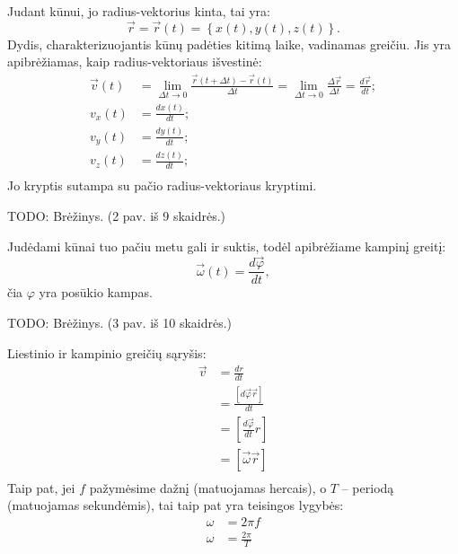 Judant kūnui, jo radius-vektorius kinta, tai yra:
\begin{equation*}
  \vec{r} = \vec{r}(t) = \left\{ x(t), y(t), z(t) \right\}.
\end{equation*}
Dydis, charakterizuojantis kūnų padėties kitimą laike, vadinamas
greičiu. Jis yra apibrėžiamas, kaip radius-vektoriaus išvestinė:
\begin{align*}
  \vec{v}(t)
    &= \lim_{\Delta t \to 0}
      \frac{\vec{r}(t + \Delta t) - \vec{r}(t)}{\Delta t}
    = \lim_{\Delta t \to 0} \frac{\Delta \vec{r}}{\Delta t}
    = \frac{d \vec{r}}{dt}; \\
  v_{x}(t) &= \frac{dx(t)}{dt}; \\
  v_{y}(t) &= \frac{dy(t)}{dt}; \\
  v_{z}(t) &= \frac{dz(t)}{dt}; \\
\end{align*}
Jo kryptis sutampa su pačio radius-vektoriaus kryptimi.

TODO: Brėžinys. (2 pav. iš 9 skaidrės.)

Judėdami kūnai tuo pačiu metu gali ir suktis, todėl apibrėžiame
kampinį greitį:
\begin{equation*}
  \vec{\omega}(t) = \frac{d\vec{\varphi}}{dt},
\end{equation*}
čia $\varphi$ yra posūkio kampas.

TODO: Brėžinys. (3 pav. iš 10 skaidrės.)

Liestinio ir kampinio greičių sąryšis:
\begin{align*}
  \vec{v}
  &= \frac{dr}{dt} \\
  &= \frac{\left[ d\vec{\varphi} \vec{r} \right]}{dt} \\
  &= \left[ \frac{d\vec{\varphi}}{dt}r \right] \\
  &= \left[ \vec{\omega}\vec{r} \right] \\
\end{align*}
Taip pat, jei $f$ pažymėsime dažnį (matuojamas hercais), o $T$ – periodą
(matuojamas sekundėmis), tai taip pat yra teisingos lygybės:
\begin{align*}
  \omega &= 2 \pi f \\
  \omega &= \frac{2 \pi}{T} \\
\end{align*}


